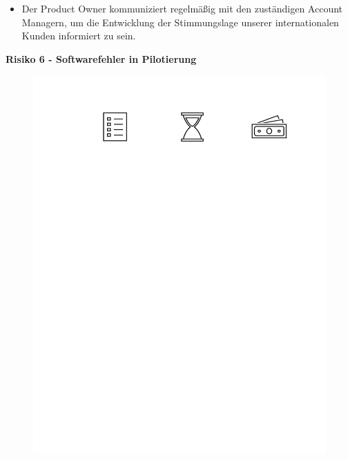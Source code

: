 \begin{itemize}
	\item Der Product Owner kommuniziert regelmäßig mit den zuständigen Account Managern, um die Entwicklung der Stimmungslage unserer internationalen Kunden informiert zu sein. 
\end{itemize}



\vspace*{0.3cm}
\textbf{Risiko 6 - Softwarefehler in Pilotierung}
\vspace*{0.1cm}

\begin{figure}
	\includegraphics[width=\linewidth]{img/Risikotyp_Zeit}
\end{figure}


